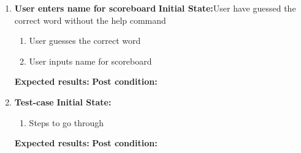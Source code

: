 \documentclass{article}
\begin{document}
\begin{enumerate}
	\item \textbf{User enters name for scoreboard}\newline
	\textbf{Initial State:}User have guessed the correct word without the help command
	\begin{enumerate}
	\item User guesses the correct word
	\item User inputs name for scoreboard
	\end{enumerate}
	\textbf{Expected results:}\newline
	\textbf{Post condition:}\newline



	\item \textbf{Test-case}\newline
	\textbf{Initial State:}
	\begin{enumerate}
	\item Steps to go through
	\end{enumerate}
	\textbf{Expected results:}\newline
	\textbf{Post condition:}\newline
	\end{enumerate}
\end{document}
